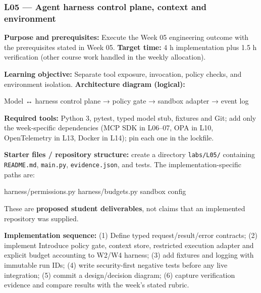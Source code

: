 \documentclass[
  10pt,
]{article}
\newenvironment{Shaded}{\begin{snugshade}}{\end{snugshade}}
\newcommand{\NormalTok}[1]{#1}
\begin{document}
\subsubsection{L05 --- Agent harness control plane, context and
environment}\label{l05-agent-harness-control-plane-context-and-environment}

\textbf{Purpose and prerequisites:} Execute the Week 05 engineering
outcome with the prerequisites stated in Week 05. \textbf{Target time:}
4 h implementation plus 1.5 h verification (other course work handled in
the weekly allocation).

\textbf{Learning objective:} Separate tool exposure, invocation, policy
checks, and environment isolation. \textbf{Architecture diagram
(logical):}

\begin{Shaded}
\begin{Highlighting}[]
\NormalTok{Model ↔ harness control plane → policy gate → sandbox}
\NormalTok{adapter → event log}
\end{Highlighting}
\end{Shaded}

\textbf{Required tools:} Python 3, pytest, typed model stub, fixtures
and Git; add only the week-specific dependencies (MCP SDK in L06--07,
OPA in L10, OpenTelemetry in L13, Docker in L14); pin each one in the
lockfile.

{\raggedright \textbf{Starter files / repository structure:} create a directory
\texttt{labs/\allowbreak L05/} containing \texttt{README.md}, \texttt{main.py},
\texttt{evidence.json}, and tests. The implementation-specific paths
are:\par}

\begin{Shaded}
\begin{Highlighting}[]
\NormalTok{harness/permissions.py}
\NormalTok{harness/budgets.py}
\NormalTok{sandbox config}
\end{Highlighting}
\end{Shaded}

These are \textbf{proposed student deliverables}, not claims that an
implemented repository was supplied.

{\raggedright \textbf{Implementation sequence:} (1) Define typed request/\allowbreak result/\allowbreak error
contracts; (2) implement Introduce policy gate, context store,
restricted execution adapter and explicit budget accounting to W2/\allowbreak W4
harness; (3) add fixtures and logging with immutable run IDs; (4) write
security-first negative tests before any live integration; (5) commit a
design/\allowbreak decision diagram; (6) capture verification evidence and compare
results with the week's stated rubric.\par}
\end{document}

